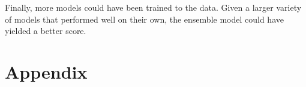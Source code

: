 \documentclass{article}\usepackage[]{graphicx}\usepackage[]{color}
\begin{document}
Finally, more models could have been trained to the data. Given a larger variety of models that performed well on their own, the ensemble model could have yielded a better score.
\clearpage
\appendix
\section*{Appendix}
\label{sec:appendix}
\end{document}
